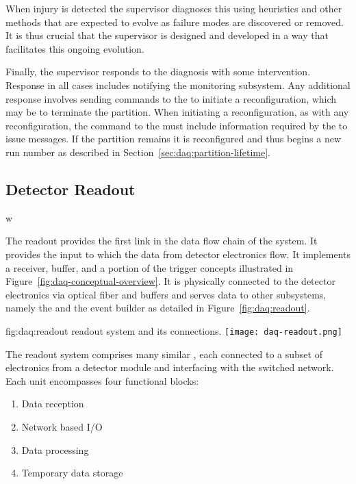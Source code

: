 When injury is detected the supervisor  diagnoses this using heuristics and other methods that are expected to evolve as failure modes are discovered or removed. 
It is thus crucial that the supervisor is designed and developed in a way that facilitates this ongoing evolution.  

Finally, the supervisor responds to the diagnosis with some intervention. 
Response  in all cases includes notifying the monitoring subsystem. 
Any additional response involves sending commands to the  to initiate a reconfiguration,  which may be to terminate the partition.
When initiating a reconfiguration, as with any reconfiguration, the command to the  must include information required by the  to issue  messages. 
If the partition remains it is reconfigured and thus begins a new run number as described in Section~\ref{sec:daq:partition-lifetime}.


\subsection{Detector Readout}
\label{sec:daq:design-readout}w

The readout provides the first link in the data flow chain of the  system.
It provides the input to which the data from detector electronics flow.
It implements a receiver, buffer, and a portion of the trigger concepts illustrated in Figure~\ref{fig:daq-conceptual-overview}.
It is physically connected to the detector electronics via optical fiber and buffers and serves data to other  subsystems, namely the  and the event builder as detailed in Figure~\ref{fig:daq:readout}.


\begin{dunefigure}{fig:daq:readout}{  readout system and its connections.}
  \texttt{[image: daq-readout.png]}
\end{dunefigure}

The readout system comprises many similar , each connected to a subset of electronics from a detector module and interfacing with the  switched network.  Each unit encompasses four functional blocks:

\begin{enumerate}
\item Data reception
\item Network based I/O
\item Data processing
\item Temporary data storage
\end{enumerate}

